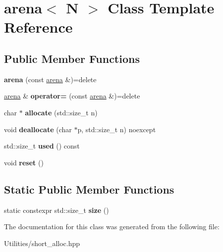 \hypertarget{classarena}{\section{arena$<$ N $>$ Class Template Reference}
\label{classarena}
}
\subsection*{Public Member Functions}
\begin{DoxyCompactItemize}
\item 
\hypertarget{classarena_a7918a883669af997b12cc0adb06d3281}{{\bfseries arena} (const \hyperlink{classarena}{arena} \&)=delete}\label{classarena_a7918a883669af997b12cc0adb06d3281}

\item 
\hypertarget{classarena_aa1c476ed87280905ccbe04379056ece8}{\hyperlink{classarena}{arena} \& {\bfseries operator=} (const \hyperlink{classarena}{arena} \&)=delete}\label{classarena_aa1c476ed87280905ccbe04379056ece8}

\item 
\hypertarget{classarena_a1868548e304e8ded66086308deab628d}{char $\ast$ {\bfseries allocate} (std\+::size\+\_\+t n)}\label{classarena_a1868548e304e8ded66086308deab628d}

\item 
\hypertarget{classarena_a07eacd78bf44a84cc7e6c7edd4d29831}{void {\bfseries deallocate} (char $\ast$p, std\+::size\+\_\+t n) noexcept}\label{classarena_a07eacd78bf44a84cc7e6c7edd4d29831}

\item 
\hypertarget{classarena_ae49f93351ef73733f0136acff717bb80}{std\+::size\+\_\+t {\bfseries used} () const }\label{classarena_ae49f93351ef73733f0136acff717bb80}

\item 
\hypertarget{classarena_a99d5ba663f0c3756247c70eb9ac8f355}{void {\bfseries reset} ()}\label{classarena_a99d5ba663f0c3756247c70eb9ac8f355}

\end{DoxyCompactItemize}
\subsection*{Static Public Member Functions}
\begin{DoxyCompactItemize}
\item 
\hypertarget{classarena_a0675ecdaa760ea7d5b2a0ee01b7ac20f}{static constexpr std\+::size\+\_\+t {\bfseries size} ()}\label{classarena_a0675ecdaa760ea7d5b2a0ee01b7ac20f}

\end{DoxyCompactItemize}


The documentation for this class was generated from the following file\+:\begin{DoxyCompactItemize}
\item 
Utilities/short\+\_\+alloc.\+hpp\end{DoxyCompactItemize}

